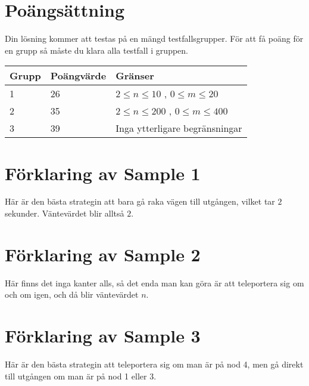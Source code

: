 \section*{Poängsättning}
Din lösning kommer att testas på en mängd testfallsgrupper. För att få poäng för en grupp så måste du klara alla testfall i gruppen.

\noindent
\begin{tabular}{| l | l | l |}
\hline
Grupp & Poängvärde & Gränser \\ \hline
1     & 26         &  $2 \le n \le 10$ , $0 \le m \le 20$ \\ \hline
2     & 35         &  $2 \le n \le 200$ , $0 \le m \le 400$ \\ \hline
3     & 39         & Inga ytterligare begränsningar \\ \hline
\end{tabular}

\section*{Förklaring av Sample 1}
Här är den bästa strategin att bara gå raka vägen till utgången, vilket tar $2$ sekunder. Väntevärdet blir alltså $2$.

\section*{Förklaring av Sample 2}
Här finns det inga kanter alls, så det enda man kan göra är att teleportera sig om och om igen, och då blir väntevärdet $n$.

\section*{Förklaring av Sample 3}
Här är den bästa strategin att teleportera sig om man är på nod 4, men gå direkt till utgången om man är på nod 1 eller 3.
